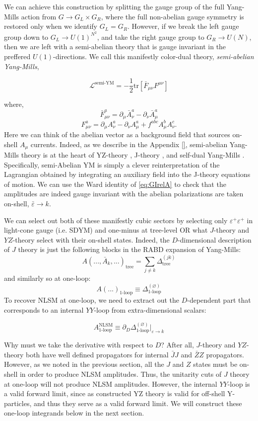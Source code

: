 \documentclass[11pt,letter]{article}
\def\be{\begin{equation}}
\def\ee{\end{equation}}
\begin{document}
We can achieve this construction by splitting the gauge group of the full Yang-Mills action from $G \rightarrow G_L \times G_R$, where the full non-abelian gauge symmetry is restored only when we identify $G_L = G_R$. However, if we break the left gauge group down to $G_L \rightarrow U(1)^{N^2}$, and take the right gauge group to $G_R \rightarrow U(N)$, then we are left with a semi-abelian theory that is gauge invariant in the preffered $U(1)$-directions. We call this manifestly color-dual theory, \textit{semi-abelian Yang-Mills},
\begin{eBox}
\be
\label{eq:semiYM}
\mathcal{L}^{\text{semi-YM}} = -\frac{1}{2}\text{tr}\left[\bar{F}_{\mu\nu}F^{\mu\nu}\right]
\ee
\end{eBox}
where,
\be
\bar{F}^a_{\mu\nu} = \partial_\mu \bar{A}_\nu^a - \partial_\nu \bar{A}_\mu^a
\ee
\be
F^a_{\mu\nu} = \partial_\mu A_\nu^a - \partial_\nu A_\mu^a + f^{abc} A_\mu^b A_\nu^c .
\ee
Here we can think of the abelian vector as a background field that sources on-shell $A_\mu$ currents. Indeed, as we describe in the Appendix \ref{}, semi-abelian Yang-Mills theory is at the heart of YZ-theory \cite{}, J-theory \cite{}, and self-dual Yang-Mills \cite{}.
Specifically, semi-Abelian YM is simply a clever reinterpretation of the Lagrangian obtained by integrating an auxiliary field into the J-theory equations of motion.
We can use the Ward identity of \ref{eq:GIrelA} to check that the amplitudes are indeed gauge invariant with the abelian polarizations are taken on-shell, $\bar{\varepsilon} \rightarrow k$.

We can select out both of these manifestly cubic sectors by selecting only $\varepsilon^+\varepsilon^+$ in light-cone gauge (i.e. SDYM) and one-minus at tree-level OR what $J$-theory and $YZ$-theory select with their on-shell states. Indeed, the $D$-dimensional description of $J$ theory is just the following blocks in the RABD expansion of Yang-Mills:
\be
A(...,\bar{A}_k,...)_{\text{tree}} = \sum_{j\neq k}\Delta^{(jk)}_{\text{tree}}
\ee
and similarly so at one-loop:
\be
A(...)_{\text{1-loop}} \equiv \Delta^{(\varnothing)}_{\text{1-loop}}
\ee
To recover NLSM at one-loop, we need to extract out the $D$-dependent part that corresponds to an internal $YY$-loop from extra-dimensional scalars:
\begin{eBox}
\be
A^{\text{NLSM}}_{\text{1-loop}} \equiv \partial_D \Delta^{(\varnothing)}_{\text{1-loop}}\big|_{\varepsilon\rightarrow k}
\ee
\end{eBox}
Why must we take the derivative with respect to $D$? After all, $J$-theory and $YZ$-theory both have well defined propagators for internal $\bar{J}J$ and $\bar{Z}Z$ propagators. However, as we noted in the previous section, all the $J$ and $Z$ states must be on-shell in order to produce NLSM amplitudes. Thus, the unitarity cuts of $J$ theory at one-loop will not produce NLSM amplitudes. However, the internal $YY$-loop is a valid forward limit, since as constructed YZ theory is valid for off-shell Y-particles, and thus they serve as a valid forward limit. We will construct these one-loop integrands below in the next section. 
\end{document}
